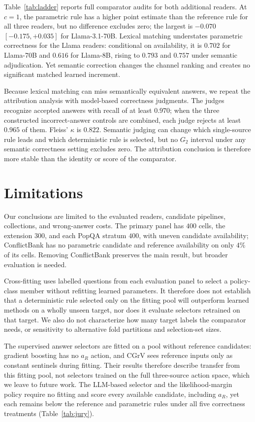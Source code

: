 \documentclass[sigconf]{acmart}
\newcommand{\CGrV}{CGrV}
\newcommand{\ar}{a_R}
\begin{document}
Table~\ref{tab:ladder} reports full comparator audits for both
additional readers. At $c{=}1$, the parametric rule has a higher point
estimate than the reference rule for all three readers, but no
difference excludes zero; the largest is $-0.070$
$[-0.175,\allowbreak +0.035]$ for Llama-3.1-70B. Lexical matching
understates parametric correctness for the Llama readers: conditional
on availability, it is $0.702$ for Llama-70B and $0.616$ for Llama-8B,
rising to $0.793$ and $0.757$ under semantic adjudication. Yet semantic
correction changes the channel ranking and
creates no significant matched learned increment.

Because lexical matching can miss semantically equivalent answers, we
repeat the attribution analysis with model-based correctness judgments.
The judges recognize accepted answers with recall of at least $0.970$;
when the three constructed incorrect-answer controls are combined, each
judge rejects at least $0.965$ of them. Fleiss' $\kappa$ is $0.822$.
Semantic judging can change which single-source rule leads and which
deterministic rule is selected, but no $G_2$ interval under any semantic
correctness setting excludes zero. The attribution conclusion is
therefore more stable than the identity or score of the comparator.

\section{Limitations}
\label{sec:limitations}

Our conclusions are limited to the evaluated readers, candidate
pipelines, collections, and wrong-answer costs. The primary panel has
$400$ cells, the extension $300$, and each PopQA stratum $400$, with
uneven candidate availability; ConflictBank has no parametric candidate
and reference availability on only $4\%$ of its cells. Removing
ConflictBank preserves the main result, but broader evaluation is needed.

Cross-fitting uses labelled questions from each evaluation panel to
select a policy-class member without refitting learned parameters. It
therefore does not establish that a deterministic rule selected only on
the fitting pool will outperform learned methods on a wholly unseen
target, nor does it evaluate selectors retrained on that target.
We also do not characterize how many target labels the comparator
needs, or sensitivity to alternative fold partitions and selection-set
sizes.

The supervised answer selectors are fitted on a pool without reference
candidates: gradient boosting has no $\ar$ action, and \CGrV{} sees
reference inputs only as constant sentinels during fitting. Their
results therefore describe transfer from this fitting pool, not
selectors trained on the full three-source action space, which we leave
to future work. The LLM-based selector and the likelihood-margin policy
require no fitting and score every available candidate, including
$\ar$, yet each remains below the reference and parametric rules under
all five correctness treatments (Table~\ref{tab:jury}).
\end{document}
